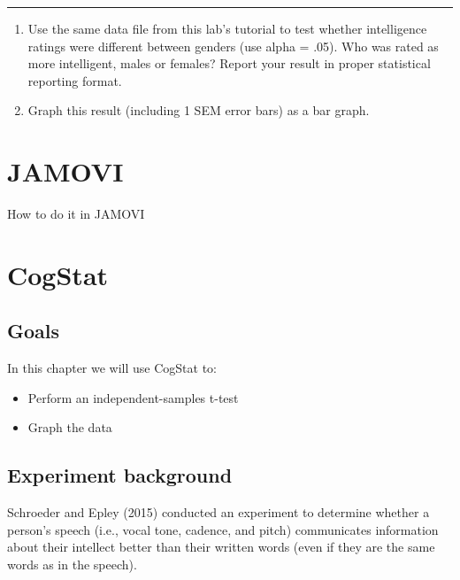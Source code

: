 \documentclass[
]{book}
\begin{document}
\begin{center}\rule{0.5\linewidth}{0.5pt}\end{center}

\begin{enumerate}
\def\labelenumi{\arabic{enumi}.}
\item
  Use the same data file from this lab's tutorial to test whether intelligence ratings were different between genders (use alpha = .05). Who was rated as more intelligent, males or females? Report your result in proper statistical reporting format.
\item
  Graph this result (including 1 SEM error bars) as a bar graph.
\end{enumerate}

\hypertarget{jamovi-7}{%
\section{JAMOVI}\label{jamovi-7}}

How to do it in JAMOVI

\hypertarget{cogstat-8}{%
\section{CogStat}\label{cogstat-8}}

\hypertarget{goals-6}{%
\subsection{Goals}\label{goals-6}}

In this chapter we will use CogStat to:

\begin{itemize}
\item
  Perform an independent-samples t-test
\item
  Graph the data
\end{itemize}

\hypertarget{experiment-background-3}{%
\subsection{Experiment background}\label{experiment-background-3}}

Schroeder and Epley (2015) conducted an experiment to determine whether a person's speech (i.e., vocal tone, cadence, and pitch) communicates information about their intellect better than their written words (even if they are the same words as in the speech).
\end{document}
